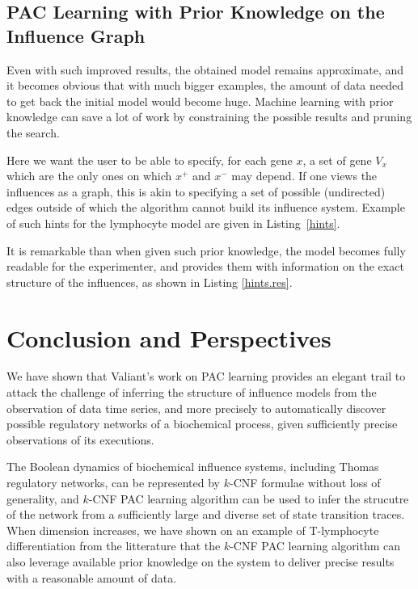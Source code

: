\documentclass{llncs}
\begin{document}
\subsection{PAC Learning with Prior Knowledge on the Influence Graph}

Even with such improved results, the obtained model remains approximate, and
it becomes obvious that with much bigger examples, the amount of data needed
to get back the initial model would become huge.
Machine learning with prior knowledge can save a lot of work by constraining the possible results and pruning the search.

Here we want the user to be able to specify, for each gene $x$, a set of gene $V_x$ which are the only ones on which $x^+$ and $x^-$ may depend. If one views the influences as a graph, this is akin to specifying a set of possible (undirected) edges outside of which the algorithm cannot build its influence system. Example of such hints for the lymphocyte model are given in Listing~\ref{hints}. 

It is remarkable than when given such prior knowledge, the model becomes fully readable for the experimenter, and provides them with information on the exact structure of the influences, as shown in Listing \ref{hints.res}.




\section{Conclusion and Perspectives}

We have shown that Valiant's work on PAC learning provides an elegant trail 
to attack the challenge of inferring the structure of influence models from the observation of data time series,
and more precisely to automatically discover possible regulatory networks of a biochemical process, given sufficiently precise observations of its executions.

The Boolean dynamics of biochemical influence systems, including Thomas regulatory networks, can be represented by $k$-CNF formulae without loss of generality,
and $k$-CNF PAC learning algorithm can be used to infer the strucutre of the network from
a sufficiently large and diverse set of state transition traces.
When dimension increases, we have shown on an example of T-lymphocyte differentiation from the litterature
that the $k$-CNF PAC learning algorithm can also leverage available
prior knowledge on the system to deliver precise results with a reasonable
amount of data.
\end{document}

